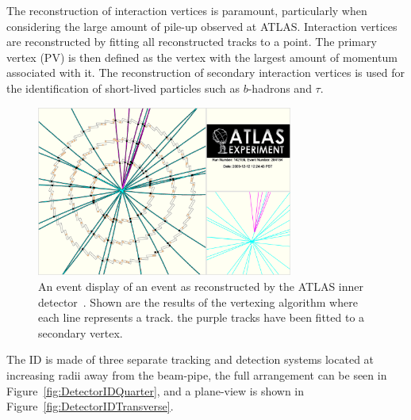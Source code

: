 The reconstruction of interaction vertices is paramount, particularly when considering the large amount of pile-up observed at ATLAS. Interaction vertices are reconstructed by fitting all reconstructed tracks to a point. The primary vertex (PV) is then defined as the vertex with the largest amount of momentum associated with it. The reconstruction of secondary interaction vertices is used for the identification of short-lived particles such as $b$-hadrons and $\tau$.

\begin{figure}[htbp]
  \centering
  \includegraphics[width=0.75\textwidth]{PartDetector/Diagrams/fig_14.eps}
  \caption[An event display of an event as reconstructed by the ATLAS inner detector.]{An event display of an event as reconstructed by the ATLAS inner detector~\cite{Detector:ATLASExperimentGeneral}. Shown are the results of the vertexing algorithm where each line represents a track. the purple tracks have been fitted to a secondary vertex.}
  \label{fig:DetectorEventDisplayID}
\end{figure}

The ID is made of three separate tracking and detection systems located at increasing radii away from the beam-pipe, the full arrangement can be seen in Figure~\ref{fig:DetectorIDQuarter}, and a plane-view is shown in Figure~\ref{fig:DetectorIDTransverse}.

